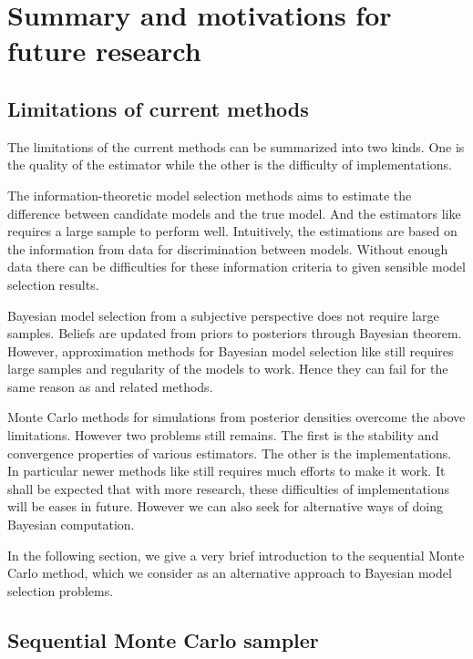 \chapter{Summary and motivations for future research}
\label{cha:Summary and motivations for future research}

\section{Limitations of current methods}
\label{sec:Limitations of current methods}

The limitations of the current methods can be summarized into two kinds. One is the quality of the estimator while
the other is the difficulty of implementations.

The information-theoretic model selection methods aims to estimate the difference between candidate models and the
true model. And the estimators like \aic requires a large sample to perform well. Intuitively, the estimations are
based on the information from data for discrimination between models. Without enough data there can be difficulties
for these information criteria to given sensible model selection results.

Bayesian model selection from a subjective perspective does not require large samples. Beliefs are updated from
priors to posteriors through Bayesian theorem. However, approximation methods for Bayesian model selection like
\bic still requires large samples and regularity of the models to work. Hence they can fail for the same reason as
\aic and related methods.

Monte Carlo methods for simulations from posterior densities overcome the above limitations. However two problems
still remains. The first is the stability and convergence properties of various estimators. The other is the
implementations. In particular newer methods like \rjmcmc still requires much efforts to make it work. It shall be
expected that with more research, these difficulties of implementations will be eases in future. However we can
also seek for alternative ways of doing Bayesian computation.

In the following section, we give a very brief introduction to the sequential Monte Carlo method, which we consider
as an alternative approach to Bayesian model selection problems.

\section{Sequential Monte Carlo sampler}
\label{sec:Sequential Monte Carlo sampler}

